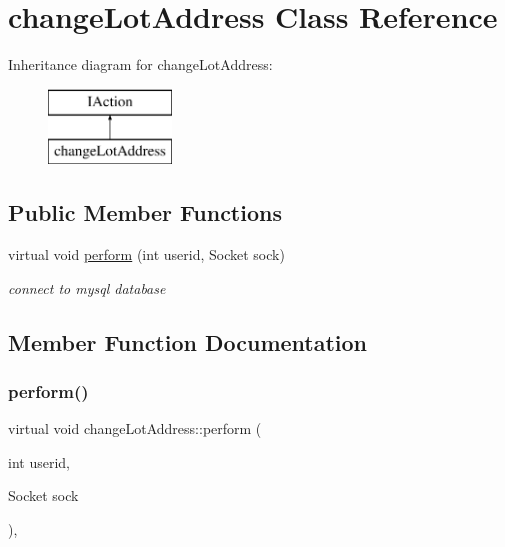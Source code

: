 \hypertarget{classchange_lot_address}{}\section{change\+Lot\+Address Class Reference}
\label{classchange_lot_address}
Inheritance diagram for change\+Lot\+Address\+:\begin{figure}[H]
\begin{center}
\leavevmode
\includegraphics[height=2.000000cm]{classchange_lot_address}
\end{center}
\end{figure}
\subsection*{Public Member Functions}
\begin{DoxyCompactItemize}
\item 
virtual void \mbox{\hyperlink{classchange_lot_address_a506b13054e3f579bbc47b04e290a4ddf}{perform}} (int userid, Socket sock)
\begin{DoxyCompactList}\small\item\em connect to mysql database \end{DoxyCompactList}\end{DoxyCompactItemize}


\subsection{Member Function Documentation}
\mbox{\label{classchange_lot_address_a506b13054e3f579bbc47b04e290a4ddf}} 
\subsubsection{\texorpdfstring{perform()}{perform()}}
{\footnotesize\ttfamily virtual void change\+Lot\+Address\+::perform (\begin{DoxyParamCaption}\item[{int}]{userid,  }\item[{Socket}]{sock }\end{DoxyParamCaption})\hspace{0.3cm}{\ttfamily [inline]}, {\ttfamily [virtual]}}



